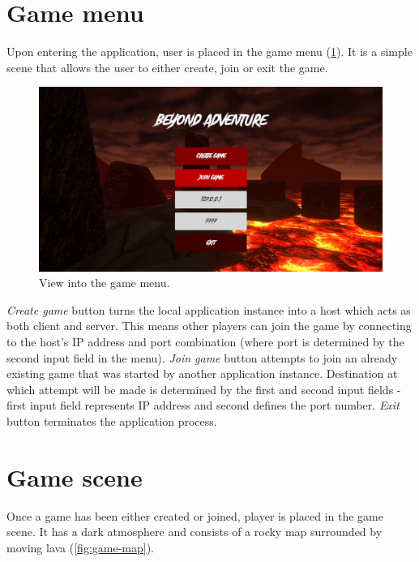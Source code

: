 \documentclass[times, utf8, diplomski]{fer}
\begin{document}
\section{Game menu}
Upon entering the application, user is placed in the game menu (\ref{fig:main-menu}). It is a simple scene that allows the user to either create, join or exit the game.

\begin{figure}[H]
	\centering
	\includegraphics[scale=0.5]{MainMenu}
	\caption{View into the game menu.}
	\label{fig:main-menu}
\end{figure}

\textit{Create game} button turns the local application instance into a host which acts as both client and server. This means other players can join the game by connecting to the host's IP address and port combination (where port is determined by the second input field in the menu). \textit{Join game} button attempts to join an already existing game that was started by another application instance. Destination at which attempt will be made is determined by the first and second input fields - first input field represents IP address and second defines the port number. \textit{Exit} button terminates the application process.

\section{Game scene}
Once a game has been either created or joined, player is placed in the game scene. It has a dark atmosphere and consists of a rocky map surrounded by moving lava (\ref{fig:game-map}).\\
\end{document}
